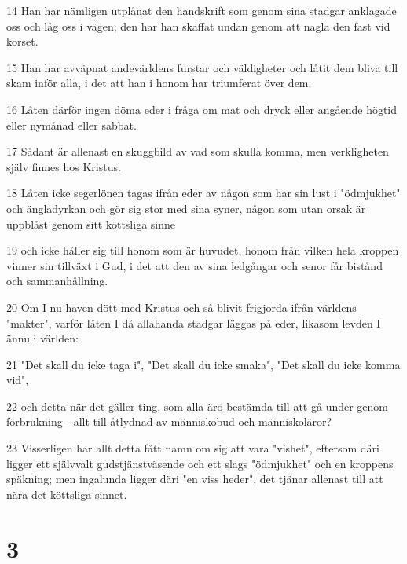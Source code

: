 \par 14 Han har nämligen utplånat den handskrift som genom sina stadgar anklagade oss och låg oss i vägen; den har han skaffat undan genom att nagla den fast vid korset.
\par 15 Han har avväpnat andevärldens furstar och väldigheter och låtit dem bliva till skam inför alla, i det att han i honom har triumferat över dem.
\par 16 Låten därför ingen döma eder i fråga om mat och dryck eller angående högtid eller nymånad eller sabbat.
\par 17 Sådant är allenast en skuggbild av vad som skulla komma, men verkligheten själv finnes hos Kristus.
\par 18 Låten icke segerlönen tagas ifrån eder av någon som har sin lust i "ödmjukhet" och ängladyrkan och gör sig stor med sina syner, någon som utan orsak är uppblåst genom sitt köttsliga sinne
\par 19 och icke håller sig till honom som är huvudet, honom från vilken hela kroppen vinner sin tillväxt i Gud, i det att den av sina ledgångar och senor får bistånd och sammanhållning.
\par 20 Om I nu haven dött med Kristus och så blivit frigjorda ifrån världens "makter", varför låten I då allahanda stadgar läggas på eder, likasom levden I ännu i världen:
\par 21 "Det skall du icke taga i", "Det skall du icke smaka", "Det skall du icke komma vid",
\par 22 och detta när det gäller ting, som alla äro bestämda till att gå under genom förbrukning - allt till åtlydnad av människobud och människoläror?
\par 23 Visserligen har allt detta fått namn om sig att vara "vishet", eftersom däri ligger ett självvalt gudstjänstväsende och ett slags "ödmjukhet" och en kroppens späkning; men ingalunda ligger däri "en viss heder", det tjänar allenast till att nära det köttsliga sinnet.

\chapter{3}

